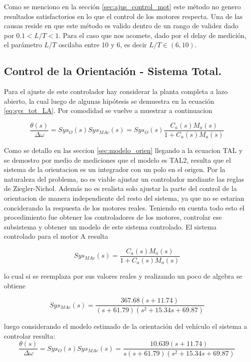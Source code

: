 \documentclass[10pt,conference,a4paper,onecolumn]{article}%
\begin{document}
Como se menciono en la sección \ref{sec:ajus_control_mot} este método no genero resultados satisfactorios en lo que el control de los motores respecta. Una de las causas reside en que este método es valido dentro de un rango de validez \cite[pág. 60]{biblia_PID} dado por $0.1<L/T<1$. Para el caso que nos acomete, dado por el delay de medición, el parámetro $L/T$ oscilaba entre 10 y 6, es decir $L/T \in (6,10) $. 
\subsection{Control de la Orientación - Sistema Total.}

Para el ajuste de este controlador hay considerar la planta completa a lazo abierto, la cual luego de algunas hipótesis se demuestra en la ecuación \ref{eq:sys_tot_LA}. Por comodidad se vuelve a  muestrar a continuacion

\begin{equation*}
\frac{\theta(s)}{\Delta \omega}=Sys_O(s)Sys_{MAc}(s)=Sys_O(s)\frac{C_a(s)M_a(s)}{1+C_a(s)M_a(s)}
\end{equation*}

Como se detallo en las seccion \ref{sec:modelo_orien} llegando a la ecuacion TAL y se demostro por medio de mediciones que el modelo es TAL2, resulta que el sistema de la orientacion es un integrador con un polo en el origen. Por la naturaleza del problema, no es viable ajustar un controlador mediante las reglas de Ziegler-Nichol. Además no es realista solo ajustar la parte del control de la orientacion de manera independiente del resto del sistema, ya que no se estarian conciderando la respuesta de los motores reales. Teniendo en cuenta todo esto el procedimiento fue obtener los controladores de los motores, controlar ese subsistema y obtener un modelo de este sistema controlado. El sistema controlado para el motor A resulta

\begin{equation}
Sys_{MAc}(s)=\frac{C_a(s)M_a(s)}{1+C_a(s)M_a(s)}
\end{equation}    

lo cual si se reemplaza por sus valores reales y realizando un poco de algebra se obtiene

\begin{equation}
Sys_{MAc}(s)=\frac{367.68(s+11.74)}{(s+61.79) (s^2 + 15.34s + 69.87)}
\end{equation}

luego considerando el modelo estimado de la orientación del vehículo el sistema a controlar resulta:
\begin{equation}
\frac{\theta(s)}{\Delta \omega}=Sys_O(s)Sys_{MAc}(s)=\frac{10.639 (s+11.74)}{s (s+61.79) (s^2 + 15.34s + 69.87)}
\end{equation}
\end{document}
